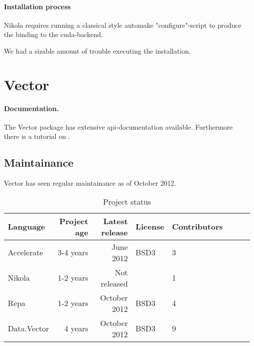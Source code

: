 \paragraph{Installation process} Nikola requires running a classical style
automake "configure"-script to produce the binding to the cuda-backend.

We had a sizable amount of trouble executing the installation. 

\section{Vector}

\paragraph{Documentation.} The Vector package has extensive api-documentation
available. Furthermore there is a tutorial on
\cite{homepage:haskell:vectortutorial}.

\subsection{Maintainance} Vector has seen regular maintainance as of October 2012.

\begin{table}
  \centering
  \begin{tabular}{l|rrllllr}
    Language    & Project age & Latest release & License & Contributors \\ \hline
    Accelerate  & 3-4 years   & June 2012      & BSD3    & 3 \\
    Nikola      & 1-2 years   & Not released   & \todo{???}    & 1 \\
    Repa        & 1-2 years   & October 2012   & BSD3    & 4 \\
    Data.Vector & 4 years     & October 2012   & BSD3    & 9 \\
  \end{tabular}
  \caption{Project status}
  \label{tab:project_status}
\end{table}


